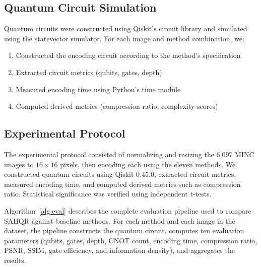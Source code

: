 \documentclass{ipol}
\begin{document}
\subsection{Quantum Circuit Simulation}

Quantum circuits were constructed using Qiskit's circuit library and simulated using the statevector simulator. For each image and method combination, we:

\begin{enumerate}
\item Constructed the encoding circuit according to the method's specification
\item Extracted circuit metrics (qubits, gates, depth)
\item Measured encoding time using Python's time module
\item Computed derived metrics (compression ratio, complexity scores)~\cite{bib72,bib73}
\end{enumerate}

\subsection{Experimental Protocol}
The experimental protocol consisted of normalizing and resizing the 6,097 MINC images to $16 \times 16$ pixels, then encoding each using the eleven methods. We constructed quantum circuits using Qiskit 0.45.0, extracted circuit metrics, measured encoding time, and computed derived metrics such as compression ratio. Statistical significance was verified using independent t-tests.

Algorithm~\ref{alg:eval} describes the complete evaluation pipeline used to compare SAHQR against baseline methods. For each method and each image in the dataset, the pipeline constructs the quantum circuit, computes ten evaluation parameters (qubits, gates, depth, CNOT count, encoding time, compression ratio, PSNR, SSIM, gate efficiency, and information density), and aggregates the results.
\end{document}
